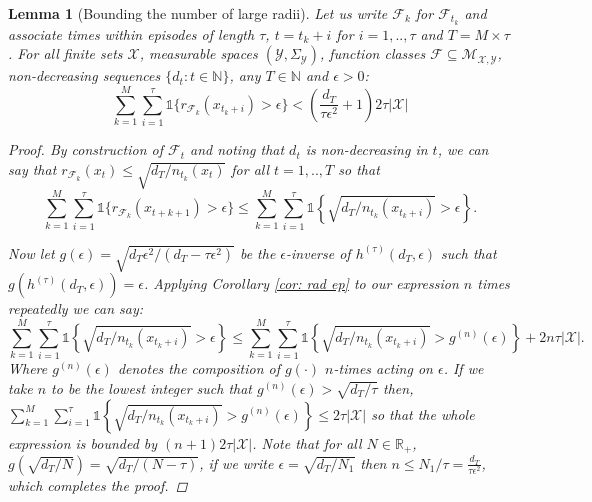 \documentclass{article}
\newtheorem{lemma}{Lemma}
\newcommand{\Real}{\mathds{R}}
\newcommand{\Nat}{\mathbb{N}}
\newcommand{\Ind}{\mathds{1}}
\newcommand{\Xc}{\mathcal{X}}
\newcommand{\Yc}{\mathcal{Y}}
\newcommand{\Fc}{\mathcal{F}}
\newcommand{\Mc}{\mathcal{M}}
\begin{document}
\begin{lemma}[Bounding the number of large radii]
\label{lem: large rad} \hspace{0.000000001mm} \newline
Let us write $\Fc_k$ for $\Fc_{t_k}$ and associate times within episodes of length $\tau$, $t = t_k+i$ for $i=1,..,\tau$ and $T = M \times \tau$.
For all finite sets $\Xc$, measurable spaces $(\Yc,\Sigma_{\Yc})$, function classes $\Fc \subseteq \Mc_{\Xc,\Yc}$, non-decreasing sequences
$\{d_t : t \in \Nat \}$, any $T \in \Nat$ and $\epsilon >0$:
$$ \sum_{k=1}^M \sum_{i=1}^\tau \Ind\{r_{\Fc_k}(x_{t_k+i}) > \epsilon \} < \left( \frac{d_T}{\tau \epsilon^2} +1 \right) 2\tau | \Xc | $$

\begin{proof}
By construction of $\Fc_t$ and noting that $d_t$ is non-decreasing in $t$, we can say that $r_{\Fc_k}(x_t) \le \sqrt{d_T / n_{t_k}(x_t)} $ for all $ t = 1,..,T$ so that
$$ \sum_{k=1}^M \sum_{i=1}^\tau \Ind\{r_{\Fc_k}(x_{t+k+1}) > \epsilon \}
	 \le \sum_{k=1}^M \sum_{i=1}^\tau  \Ind \left\{ \sqrt{ d_T / n_{t_k}(x_{t_k+i}) } > \epsilon \right\}  .$$

Now let $g(\epsilon) = \sqrt{d_T \epsilon^2 / (d_T - \tau \epsilon^2)}$ be the $\epsilon$-inverse of $h^{(\tau)}(d_T,\epsilon)$ such that $g( h^{(\tau)}(d_T,\epsilon)) = \epsilon$.
Applying Corollary \ref{cor: rad ep} to our expression $n$ times repeatedly we can say:
$$\sum_{k=1}^M \sum_{i=1}^\tau  \Ind \left\{ \sqrt{ d_T / n_{t_k}(x_{t_k+i}) } > \epsilon \right\} \le
	\sum_{k=1}^M \sum_{i=1}^\tau  \Ind \left\{ \sqrt{ d_T / n_{t_k}(x_{t_k+i}) } > g^{(n)}(\epsilon) \right\} + 2n \tau |\Xc|.$$
Where $g^{(n)}(\epsilon)$ denotes the composition of $g(\cdot)$ $n$-times acting on $\epsilon$.
If we take $n$ to be the lowest integer such that $g^{(n)}(\epsilon) > \sqrt{d_T / \tau}$ then,
$\sum_{k=1}^M \sum_{i=1}^\tau  \Ind \left\{ \sqrt{ d_T / n_{t_k}(x_{t_k+i}) } > g^{(n)}(\epsilon) \right\} \le 2\tau |\Xc| $ so that the whole expression is bounded by $ \left( n + 1 \right) 2\tau | \Xc |$.
Note that for all $N \in \Real_+$, $g(\sqrt{d_T / N}) = \sqrt{d_T / (N-\tau)}$, if we write $\epsilon = \sqrt{d_T / N_1}$ then $n \le N_1 / \tau = \frac{d_T}{ \tau \epsilon^2}$, which completes the proof.

\end{proof}
\end{lemma}
\end{document}
